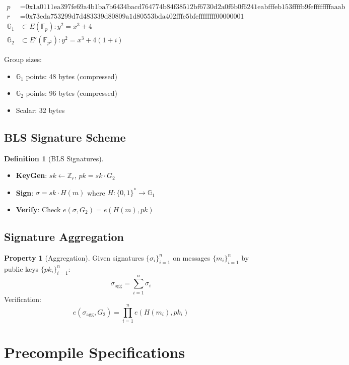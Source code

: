 \documentclass[11pt,a4paper]{article}
\theoremstyle{definition}
\newtheorem{definition}{Definition}
\newtheorem{property}{Property}
\begin{document}
\begin{align}
p &= \text{0x1a0111ea397fe69a4b1ba7b6434bacd764774b84f38512bf6730d2a0f6b0f6241eabfffeb153ffffb9feffffffffaaab} \\
r &= \text{0x73eda753299d7d483339d80809a1d80553bda402fffe5bfeffffffff00000001} \\
\mathbb{G}_1 &\subset E(\mathbb{F}_p): y^2 = x^3 + 4 \\
\mathbb{G}_2 &\subset E'(\mathbb{F}_{p^2}): y^2 = x^3 + 4(1 + i)
\end{align}

Group sizes:
\begin{itemize}
    \item $\mathbb{G}_1$ points: 48 bytes (compressed)
    \item $\mathbb{G}_2$ points: 96 bytes (compressed)
    \item Scalar: 32 bytes
\end{itemize}

\subsection{BLS Signature Scheme}

\begin{definition}[BLS Signatures]
\begin{itemize}
    \item \textbf{KeyGen}: $sk \leftarrow \mathbb{Z}_r$, $pk = sk \cdot G_2$
    \item \textbf{Sign}: $\sigma = sk \cdot H(m)$ where $H: \{0,1\}^* \to \mathbb{G}_1$
    \item \textbf{Verify}: Check $e(\sigma, G_2) = e(H(m), pk)$
\end{itemize}
\end{definition}

\subsection{Signature Aggregation}

\begin{property}[Aggregation]
Given signatures $\{\sigma_i\}_{i=1}^n$ on messages $\{m_i\}_{i=1}^n$ by public keys $\{pk_i\}_{i=1}^n$:
\[
\sigma_{\text{agg}} = \sum_{i=1}^n \sigma_i
\]
Verification:
\[
e(\sigma_{\text{agg}}, G_2) = \prod_{i=1}^n e(H(m_i), pk_i)
\]
\end{property}

\section{Precompile Specifications}
\end{document}
